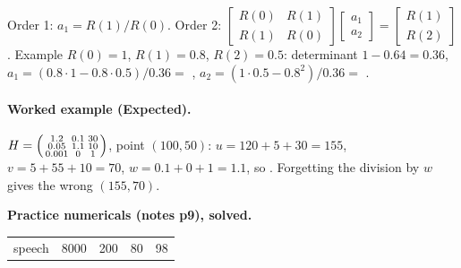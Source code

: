 Order 1: $a_1=R(1)/R(0)$. Order 2: $\begin{bmatrix}R(0)&R(1)\\R(1)&R(0)\end{bmatrix}\begin{bmatrix}a_1\\a_2\end{bmatrix}
=\begin{bmatrix}R(1)\\R(2)\end{bmatrix}$. Example $R(0)=1$, $R(1)=0.8$, $R(2)=0.5$: determinant $1-0.64=0.36$,
$a_1=(0.8\cdot1-0.8\cdot0.5)/0.36=$ , $a_2=(1\cdot0.5-0.8^2)/0.36=$ .

\paragraph{Worked example (Expected).} $H=\begin{psmallmatrix}1.2&0.1&30\\0.05&1.1&10\\0.001&0&1\end{psmallmatrix}$, point
$(100,50)$: $u=120+5+30=155$, $v=5+55+10=70$, $w=0.1+0+1=1.1$, so . Forgetting the
division by $w$ gives the wrong $(155,70)$.

\textbf{Practice numericals (notes p9), solved.}\par\nobreak
\begin{tabularx}{\linewidth}{@{}L{50mm}cccY@{}}\toprule
{} &  &  &  & \\\midrule
speech & 8000 & 200 & 80 & 98\\\bottomrule
\end{tabularx}

